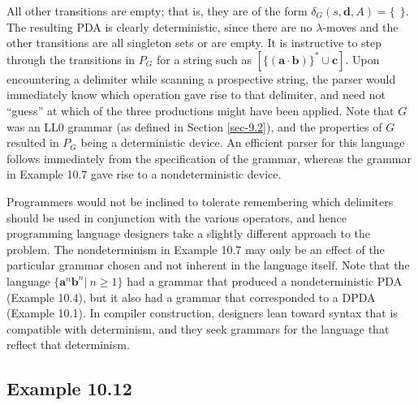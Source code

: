 All other transitions are empty; that is, they are of the form $\delta_G(s,
\pmb{d},A) = \{\ \ \}$. The resulting PDA is clearly deterministic, since there
are no $\lambda$-moves and the other transitions are all singleton sets or are
empty. It is instructive to step through the transitions in $P_G$ for a string
such as $\pmb{[\{(a\cdot b)\}^*\cup c]}$. Upon encountering a delimiter while
scanning a prospective string, the parser would immediately know which operation
gave rise to that delimiter, and need not ``guess'' at which of the three
productions might have been applied. Note that $G$ was an LL0 grammar (as
defined in Section \ref{sec-9.2}), and the properties of $G$ resulted in $P_G$ being a
deterministic device. An efficient parser for this language follows immediately
from the specification of the grammar, whereas the grammar in Example 10.7 gave
rise to a nondeterministic device.

Programmers would not be inclined to tolerate remembering which delimiters
should be used in conjunction with the various operators, and hence programming
language designers take a slightly different approach to the problem. The
nondeterminism in Example 10.7 may only be an effect of the particular grammar
chosen and not inherent in the language itself. Note that the language
$\{\pmb{a}^n\pmb{b}^n|\ n\geq 1\}$ had a grammar that produced a nondeterministic
PDA (Example 10.4), but it also had a grammar that corresponded to a DPDA
(Example 10.1). In compiler construction, designers lean toward syntax that is
compatible with determinism, and they seek grammars for the language that
reflect that determinism.

\subsection*{Example 10.12}

